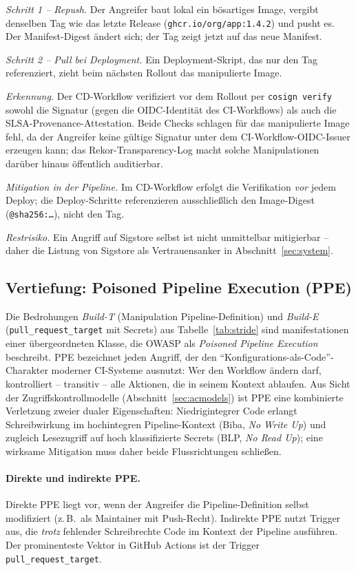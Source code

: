 \documentclass[12pt, a4paper]{scrartcl}
\begin{document}
\textit{Schritt 1 -- Repush.} Der Angreifer baut lokal ein bösartiges
Image, vergibt denselben Tag wie das letzte Release
(\texttt{ghcr.io/org/app:1.4.2}) und pusht es. Der Manifest-Digest
ändert sich; der Tag zeigt jetzt auf das neue Manifest.

\textit{Schritt 2 -- Pull bei Deployment.} Ein
Deployment-Skript, das nur den Tag referenziert, zieht beim nächsten
Rollout das manipulierte Image.

\textit{Erkennung.} Der CD-Workflow verifiziert vor dem Rollout per
\texttt{cosign verify} sowohl die Signatur (gegen die OIDC-Identität
des CI-Workflows) als auch die SLSA-Provenance-Attestation. Beide
Checks schlagen für das manipulierte Image fehl, da der Angreifer keine
gültige Signatur unter dem CI-Workflow-OIDC-Issuer erzeugen kann; das
Rekor-Transparency-Log macht solche Manipulationen darüber hinaus
öffentlich auditierbar.

\textit{Mitigation in der Pipeline.} Im CD-Workflow erfolgt die
Verifikation \emph{vor} jedem Deploy; die Deploy-Schritte
referenzieren ausschließlich den Image-Digest
(\texttt{@sha256:\dots}), nicht den Tag.

\textit{Restrisiko.} Ein Angriff auf Sigstore selbst ist nicht
unmittelbar mitigierbar -- daher die Listung von Sigstore als
Vertrauensanker in Abschnitt~\ref{sec:system}.

\subsection{Vertiefung: Poisoned Pipeline Execution (PPE)}
\label{sec:ppe}
Die Bedrohungen \emph{Build-T} (Manipulation Pipeline-Definition) und
\emph{Build-E} (\texttt{pull\_request\_target} mit Secrets) aus
Tabelle~\ref{tab:stride} sind manifestationen einer übergeordneten
Klasse, die OWASP als \emph{Poisoned Pipeline Execution}
\cite{owaspcicd} beschreibt. PPE bezeichnet jeden Angriff, der den
\enquote{Konfigurations-als-Code}-Charakter moderner CI-Systeme
ausnutzt: Wer den Workflow ändern darf, kontrolliert -- transitiv --
alle Aktionen, die in seinem Kontext ablaufen. Aus Sicht der
Zugriffskontrollmodelle (Abschnitt~\ref{sec:acmodels}) ist PPE eine
kombinierte Verletzung zweier dualer Eigenschaften: Niedrigintegrer Code
erlangt Schreibwirkung im hochintegren Pipeline-Kontext (Biba,
\emph{No Write Up}) und zugleich Lesezugriff auf hoch klassifizierte
Secrets (BLP, \emph{No Read Up}); eine wirksame Mitigation muss daher
beide Flussrichtungen schließen.

\paragraph{Direkte und indirekte PPE.}
Direkte PPE liegt vor, wenn der Angreifer die Pipeline-Definition
selbst modifiziert (z.\,B.\ als Maintainer mit Push-Recht). Indirekte
PPE nutzt Trigger aus, die \emph{trotz} fehlender Schreibrechte
Code im Kontext der Pipeline ausführen. Der prominenteste Vektor in
GitHub Actions ist der Trigger
\texttt{pull\_request\_target}.
\end{document}
